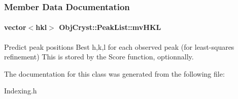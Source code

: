 \subsubsection{\-Member \-Data \-Documentation}
\paragraph[{mv\-H\-K\-L}]{\setlength{\rightskip}{0pt plus 5cm}vector$<${\bf hkl}$>$ {\bf \-Obj\-Cryst\-::\-Peak\-List\-::mv\-H\-K\-L}\hspace{0.3cm}{\ttfamily  [mutable]}}\label{a00060_a810ed3eb6c76a08488ace8b530529631}


\-Predict peak positions \-Best h,k,l for each observed peak (for least-\/squares refinement) \-This is stored by the \-Score function, optionnally. 



\-The documentation for this class was generated from the following file\-:\begin{DoxyCompactItemize}
\item 
\-Indexing.\-h\end{DoxyCompactItemize}
